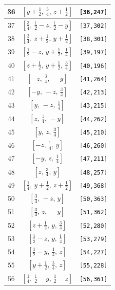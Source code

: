 \documentclass[fleqn,8pt]{jsarticle}
\begin{document}
\begin{longtable}{ccc}
36 & $\left[ y + \frac{1}{2},\, \frac{3}{4},\, z + \frac{1}{2} \right]$ & {\tt [36,247]} \\ \hline
37 & $\left[ \frac{3}{4},\, \frac{1}{2} - z,\, \frac{1}{2} - y \right]$ & {\tt [37,302]} \\ \hline
38 & $\left[ \frac{3}{4},\, z + \frac{1}{2},\, y + \frac{1}{2} \right]$ & {\tt [38,301]} \\ \hline
39 & $\left[ \frac{1}{2} - z,\, y + \frac{1}{2},\, \frac{1}{4} \right]$ & {\tt [39,197]} \\ \hline
40 & $\left[ z + \frac{1}{2},\, y + \frac{1}{2},\, \frac{3}{4} \right]$ & {\tt [40,196]} \\ \hline
41 & $\left[ - z,\, \frac{3}{4},\, - y \right]$ & {\tt [41,264]} \\ \hline
42 & $\left[ - y,\, - z,\, \frac{3}{4} \right]$ & {\tt [42,213]} \\ \hline
43 & $\left[ y,\, - z,\, \frac{1}{4} \right]$ & {\tt [43,215]} \\ \hline
44 & $\left[ z,\, \frac{1}{4},\, - y \right]$ & {\tt [44,262]} \\ \hline
45 & $\left[ y,\, z,\, \frac{3}{4} \right]$ & {\tt [45,210]} \\ \hline
46 & $\left[ - z,\, \frac{1}{4},\, y \right]$ & {\tt [46,260]} \\ \hline
47 & $\left[ - y,\, z,\, \frac{1}{4} \right]$ & {\tt [47,211]} \\ \hline
48 & $\left[ z,\, \frac{3}{4},\, y \right]$ & {\tt [48,257]} \\ \hline
49 & $\left[ \frac{1}{4},\, y + \frac{1}{2},\, z + \frac{1}{2} \right]$ & {\tt [49,368]} \\ \hline
50 & $\left[ \frac{3}{4},\, - z,\, y \right]$ & {\tt [50,363]} \\ \hline
51 & $\left[ \frac{3}{4},\, z,\, - y \right]$ & {\tt [51,362]} \\ \hline
52 & $\left[ z + \frac{1}{2},\, y,\, \frac{3}{4} \right]$ & {\tt [52,280]} \\ \hline
53 & $\left[ \frac{1}{2} - z,\, y,\, \frac{1}{4} \right]$ & {\tt [53,279]} \\ \hline
54 & $\left[ \frac{1}{2} - y,\, \frac{1}{4},\, z \right]$ & {\tt [54,227]} \\ \hline
55 & $\left[ y + \frac{1}{2},\, \frac{3}{4},\, z \right]$ & {\tt [55,228]} \\ \hline
56 & $\left[ \frac{1}{4},\, \frac{1}{2} - y,\, \frac{1}{2} - z \right]$ & {\tt [56,361]} \\ \hline

\end{longtable}
\end{document}
